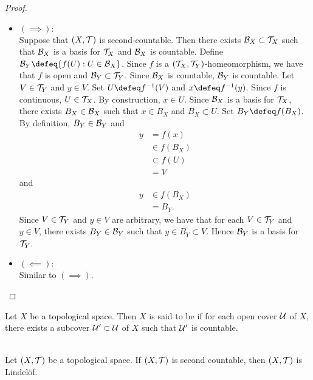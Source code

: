\documentclass{book}
\begin{document}
	\begin{proof}
		\begin{itemize}
			\item $(\implies): $ \\
			Suppose that $(X, \mathcal{T})$ is second-countable. Then there exists $\mathcal{B}_X \subset \mathcal{T}_X$ such that $\mathcal{B}_X$ is a basis for $\mathcal{T}_X$ and $\mathcal{B}_X$ is countable. Define $\MB_Y \defeq \{f(U): U \in \MB_X\}$. Since $f$ is a $(\mathcal{T}_X, \mathcal{T}_Y)$-homeomorphism, we have that $f$ is open and $\mathcal{B}_Y \subset \mathcal{T}_Y$. Since $\mathcal{B}_X$ is countable, $\mathcal{B}_Y$ is countable. Let $V \in \mathcal{T}_Y$ and $y \in V$. Set $U \defeq f^{-1}(V)$ and $x \defeq f^{-1}(y)$. Since $f$ is continuous, $U \in \mathcal{T}_X$. By construction, $x \in U$. Since $\mathcal{B}_X$ is a basis for $\mathcal{T}_X$, there exists $B_X \in \mathcal{B}_X$ such that $x \in B_X$ and $B_X \subset U$. Set $B_Y \defeq f(B_X)$. By definition, $B_Y \in \mathcal{B}_Y$ and 
			\begin{align*}
				y
				& = f(x) \\
				& \in f(B_X) \\
				& \subset f(U) \\
				& = V
			\end{align*}
			and 
			\begin{align*}
				y
				& \in f(B_X) \\
				& = B_Y .
			\end{align*}
			Since $V \in \mathcal{T}_Y$ and $y \in V$ are arbitrary, we have that for each $V \in \mathcal{T}_Y$ and $y \in V$, there exists $B_Y \in \mathcal{B}_Y$ such that $y \in B_Y \subset V$. Hence $\mathcal{B}_Y$ is a basis for $\mathcal{T}_Y$.
			\item $(\impliedby): $ \\
			Similar to $(\implies)$.
		\end{itemize}
	\end{proof}

	\begin{defn} 
		Let $X$ be a topological space. Then $X$ is said to be  if for each open cover $\mathcal{U}$ of $X$, there exists a subcover $\mathcal{U}' \subset \mathcal{U}$ of $X$ such that $\mathcal{U}'$ is countable.\\
		\\
	\end{defn}

	\begin{ex} 
		Let $(X, \mathcal{T})$ be a topological space. If $(X, \mathcal{T})$ is second countable, then $(X, \mathcal{T})$ is Lindel\"{o}f. 
	\end{ex}
\end{document}
